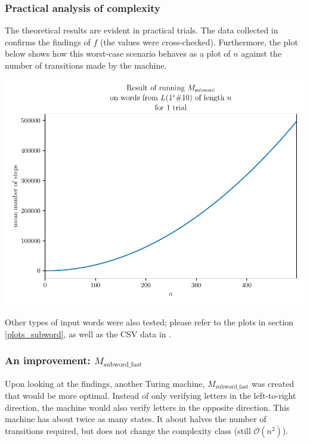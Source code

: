 \subsubsection{Practical analysis of complexity}

The theoretical results are evident in practical trials. The data collected in  confirms the findings of $f$ (the values were cross-checked). Furthermore, the plot below shows how this worst-case scenario behaves as a plot of $n$ against the number of transitions made by the machine. 

\begin{center}
    \includegraphics[width=\textwidth]{images/plots/subword-ones.pdf}
\end{center}

Other types of input words were also tested; please refer to the plots in section \ref{plots_subword}, as well as the CSV data in . 

\subsubsection{An improvement: $M_\text{subword\_fast}$}

Upon looking at the findings, another Turing machine, $M_\text{subword\_fast}$ was created that would be more optimal. Instead of only verifying letters in the left-to-right direction, the machine would also verify letters in the opposite direction. This machine has about twice as many states. It about halves the number of transitions required, but does not change the complexity class (still $\mathcal{O}(n^2)$). 

